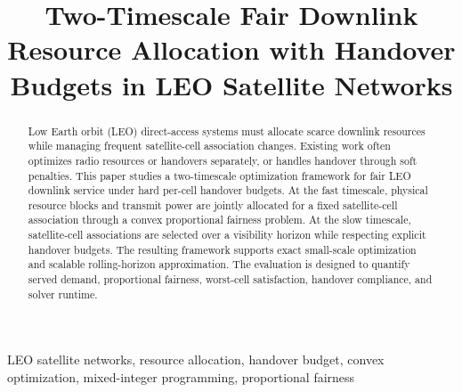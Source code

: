 \documentclass[conference]{IEEEtran}
\begin{document}
\title{Two-Timescale Fair Downlink Resource Allocation with Handover Budgets in LEO Satellite Networks}

\author{
}

\maketitle

\begin{abstract}
Low Earth orbit (LEO) direct-access systems must allocate scarce downlink
resources while managing frequent satellite-cell association changes. Existing
work often optimizes radio resources or handovers separately, or handles
handover through soft penalties. This paper studies a two-timescale optimization
framework for fair LEO downlink service under hard per-cell handover budgets.
At the fast timescale, physical resource blocks and transmit power are jointly
allocated for a fixed satellite-cell association through a convex proportional
fairness problem. At the slow timescale, satellite-cell associations are
selected over a visibility horizon while respecting explicit handover budgets.
The resulting framework supports exact small-scale optimization and scalable
rolling-horizon approximation. The evaluation is designed to quantify served
demand, proportional fairness, worst-cell satisfaction, handover compliance, and
solver runtime.
\end{abstract}

\begin{IEEEkeywords}
LEO satellite networks, resource allocation, handover budget, convex
optimization, mixed-integer programming, proportional fairness
\end{IEEEkeywords}










\end{document}
